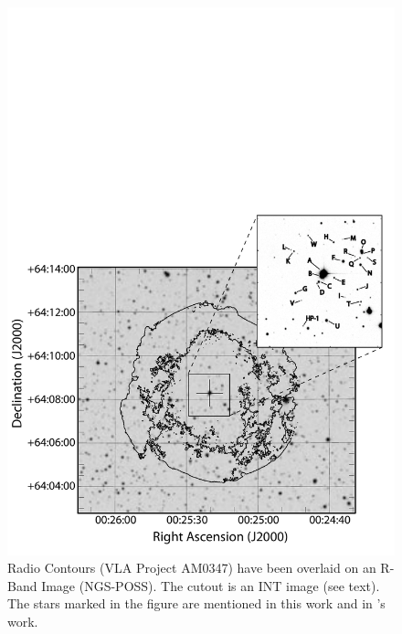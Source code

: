 \begin{figure}[h!]
\includegraphics*[width = \textwidth]{chapter_sn1572_starg/plots/overview.pdf}
\caption{Radio Contours (VLA Project AM0347) have been overlaid \citep{1996ASPC..101...80G} on an R-Band Image (NGS-POSS). The cutout is an INT image (see text). The stars marked in the figure are mentioned in this work and in \rl's work. }
\label{fig:overview}
\end{figure}

